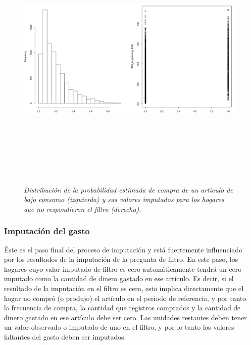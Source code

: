\documentclass[
  10pt,
  spanish,
]{book}
\begin{document}
\begin{figure}
\centering
\includegraphics[width=\textwidth,height=5.20833in]{Pics/12.png}
\caption{\emph{Distribución de la probabilidad estimada de compra de un artículo de bajo consumo (izquierda) y sus valores imputados para los hogares que no respondieron el filtro (derecha).}}
\end{figure}

\hypertarget{imputaciuxf3n-del-gasto}{%
\subsubsection*{Imputación del gasto}\label{imputaciuxf3n-del-gasto}}

Éste es el paso final del proceso de imputación y está fuertemente influenciado por los resultados de la imputación de la pregunta de filtro. En este paso, los hogares cuyo valor imputado de filtro es cero automáticamente tendrá un cero imputado como la cantidad de dinero gastado en ese artículo. Es decir, si el resultado de la imputación en el filtro es cero, esto implica directamente que el hogar no compró (o produjo) el artículo en el periodo de referencia, y por tanto la frecuencia de compra, la cantidad que registros comprados y la cantidad de dinero gastado en ese artículo debe ser cero. Las unidades restantes deben tener un valor observado o imputado de uno en el filtro, y por lo tanto los valores faltantes del gasto deben ser imputados.
\end{document}

